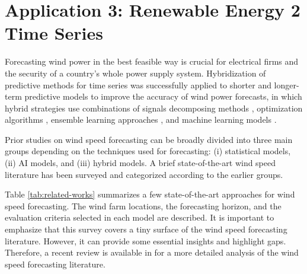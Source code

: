 \section{Application 3: Renewable Energy 2 Time Series}

Forecasting wind power in the best feasible way is crucial for electrical firms and the security of a country's whole power supply system. Hybridization of predictive methods for time series was successfully applied to shorter and longer-term predictive models to improve the accuracy of wind power forecasts, in which hybrid strategies use combinations of signals decomposing methods \cite{moreno2018Wind, han2019Wind}, optimization algorithms \cite{li2020Day}, ensemble learning approaches \cite{kim2018Shortterm, dasilva2021Novel}, and machine learning models \cite{lin2020Wind, niu2020Wind}.

Prior studies on wind speed forecasting can be broadly divided into three main groups depending on the techniques used for forecasting: (i) statistical models, (ii) \ac{AI} models, and (iii) hybrid models. A brief state-of-the-art wind speed literature has been surveyed and categorized according to the earlier groups.

Table \ref{tab:related-works} summarizes a few state-of-the-art approaches for wind speed forecasting. The wind farm locations, the forecasting horizon, and the evaluation criteria selected in each model are described. It is important to emphasize that this survey covers a tiny surface of the wind speed forecasting literature. However, it can provide some essential insights and highlight gaps. Therefore, a recent review is available in  for a more detailed analysis of the wind speed forecasting literature.

